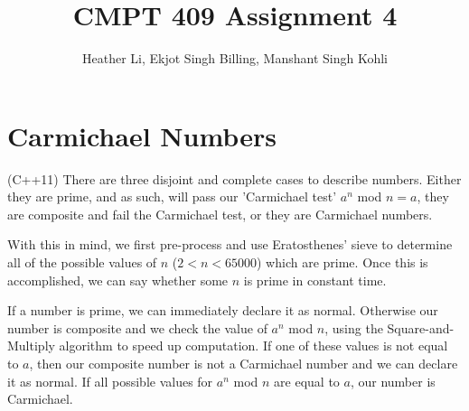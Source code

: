 \documentclass{article}
\title{CMPT 409 Assignment 4}
\author{Heather Li, Ekjot Singh Billing, Manshant Singh Kohli}
\begin{document}
\maketitle

\section{Carmichael Numbers}
(C++11) 
There are three disjoint and complete cases to describe numbers. Either they are prime, and as such, will pass our 'Carmichael test' $a^n$ mod $n =a$, they are composite and fail the Carmichael test, or they are Carmichael numbers.
\par 
With this in mind, we first pre-process and use Eratosthenes' sieve to determine all of the possible values of $n$ ($2<n<65000$) which are prime. Once this is accomplished, we can say whether some $n$ is prime in constant time.
\par 
If a number is prime, we can immediately declare it as normal. Otherwise our number is composite and we check the value of $a^n$ mod $n$, using the Square-and-Multiply algorithm to speed up computation. If one of these values is not equal to $a$, then our composite number is not a Carmichael number and we can declare it as normal. If all possible values for $a^n$ mod $n$ are equal to $a$, our number is Carmichael.
\end{document}
